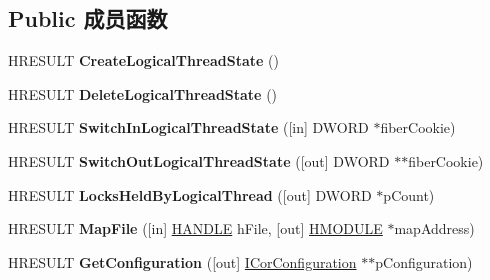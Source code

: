 \subsection*{Public 成员函数}
\begin{DoxyCompactItemize}
\item 
\mbox{\label{interface_i_cor_runtime_host_a70ea51a4cce3313535afa10c3d898c35}} 
H\+R\+E\+S\+U\+LT {\bfseries Create\+Logical\+Thread\+State} ()
\item 
\mbox{\label{interface_i_cor_runtime_host_a376afc54a10f7db49116eae1411d99bf}} 
H\+R\+E\+S\+U\+LT {\bfseries Delete\+Logical\+Thread\+State} ()
\item 
\mbox{\label{interface_i_cor_runtime_host_a1a6571fd72b1a1fe2172049d68189df6}} 
H\+R\+E\+S\+U\+LT {\bfseries Switch\+In\+Logical\+Thread\+State} (\mbox{[}in\mbox{]} D\+W\+O\+RD $\ast$fiber\+Cookie)
\item 
\mbox{\label{interface_i_cor_runtime_host_a876d50bb66742146619123c55fb1cb50}} 
H\+R\+E\+S\+U\+LT {\bfseries Switch\+Out\+Logical\+Thread\+State} (\mbox{[}out\mbox{]} D\+W\+O\+RD $\ast$$\ast$fiber\+Cookie)
\item 
\mbox{\label{interface_i_cor_runtime_host_a4a16edcb14814d8c81a8cb206ecec8a8}} 
H\+R\+E\+S\+U\+LT {\bfseries Locks\+Held\+By\+Logical\+Thread} (\mbox{[}out\mbox{]} D\+W\+O\+RD $\ast$p\+Count)
\item 
\mbox{\label{interface_i_cor_runtime_host_af38f37dfb754627a7d48991749b34f3b}} 
H\+R\+E\+S\+U\+LT {\bfseries Map\+File} (\mbox{[}in\mbox{]} \hyperlink{interfacevoid}{H\+A\+N\+D\+LE} h\+File, \mbox{[}out\mbox{]} \hyperlink{interfacevoid}{H\+M\+O\+D\+U\+LE} $\ast$map\+Address)
\item 
\mbox{\label{interface_i_cor_runtime_host_a3dc1d1ad1584b33c4b1999ff27daaa15}} 
H\+R\+E\+S\+U\+LT {\bfseries Get\+Configuration} (\mbox{[}out\mbox{]} \hyperlink{interface_i_cor_configuration}{I\+Cor\+Configuration} $\ast$$\ast$p\+Configuration)
\item 
\mbox{\label{interface_i_cor_runtime_host_a39c824242a43009a4a319111b8f6c9cf}} 

\end{DoxyCompactItemize}
